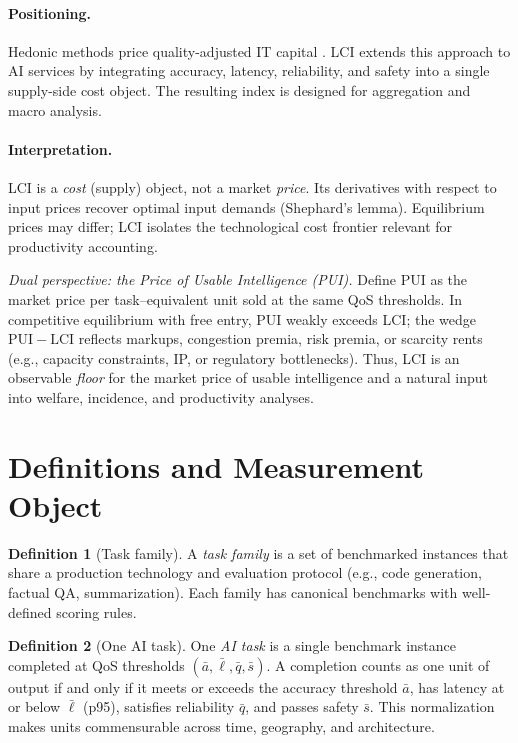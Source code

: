 \documentclass[12pt]{article}
\numberwithin{equation}{section}
\theoremstyle{definition}
\newtheorem{definition}{Definition}
\theoremstyle{plain}
\newcommand{\LCI}{\mathrm{LCI}}
\begin{document}
\paragraph{Positioning.}
Hedonic methods price quality-adjusted IT capital \citep{Triplett1989,Pakes2003,Byrne2017}. LCI extends this approach to AI services by integrating accuracy, latency, reliability, and safety into a single supply-side cost object. The resulting index is designed for aggregation and macro analysis.

\paragraph{Interpretation.}
LCI is a \emph{cost} (supply) object, not a market \emph{price}. Its derivatives with respect to input prices recover optimal input demands (Shephard’s lemma). Equilibrium prices may differ; LCI isolates the technological cost frontier relevant for productivity accounting.
\par\smallskip\textit{Dual perspective: the Price of Usable Intelligence (PUI).} Define PUI as the market price per task–equivalent unit sold at the same QoS thresholds. In competitive equilibrium with free entry, PUI weakly exceeds LCI; the wedge $\text{PUI}-\LCI$ reflects markups, congestion premia, risk premia, or scarcity rents (e.g., capacity constraints, IP, or regulatory bottlenecks). Thus, LCI is an observable \emph{floor} for the market price of usable intelligence and a natural input into welfare, incidence, and productivity analyses.

\section{Definitions and Measurement Object}
\begin{definition}[Task family]
A \emph{task family} is a set of benchmarked instances that share a production technology and evaluation protocol (e.g., code generation, factual QA, summarization). Each family has canonical benchmarks with well-defined scoring rules.
\end{definition}

\begin{definition}[One AI task]
One \emph{AI task} is a single benchmark instance completed at QoS thresholds $(\bar a,\bar\ell,\bar q,\bar s)$. A completion counts as one unit of output if and only if it meets or exceeds the accuracy threshold $\bar a$, has latency at or below $\bar\ell$ (p95), satisfies reliability $\bar q$, and passes safety $\bar s$. This normalization makes units commensurable across time, geography, and architecture.
\end{definition}
\end{document}
